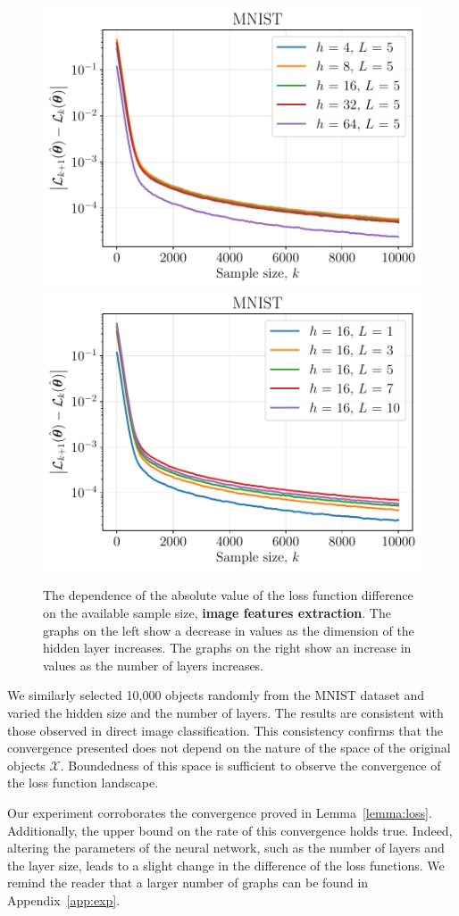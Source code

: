 \documentclass{article}
\begin{document}
\begin{figure}[ht]
    \centering
    \includegraphics[width=0.5\linewidth]{figs_extraction/mnist_hidden_size.pdf}\hfill
    \includegraphics[width=0.5\linewidth]{figs_extraction/mnist_num_layers.pdf}
    \caption{The dependence of the absolute value of the loss function difference on the available sample size, \textbf{image features extraction}. The graphs on the left show a decrease in values as the dimension of the hidden layer increases. The graphs on the right show an increase in values as the number of layers increases.}
    \label{fig:mnist-extraction}
\end{figure}

We similarly selected 10,000 objects randomly from the MNIST dataset and varied the hidden size and the number of layers. The results are consistent with those observed in direct image classification. This consistency confirms that the convergence presented does not depend on the nature of the space of the original objects $\mathcal{X}$. Boundedness of this space is sufficient to observe the convergence of the loss function landscape.

Our experiment corroborates the convergence proved in Lemma~\ref{lemma:loss}. Additionally, the upper bound on the rate of this convergence holds true. Indeed, altering the parameters of the neural network, such as the number of layers and the layer size, leads to a slight change in the difference of the loss functions. We remind the reader that a larger number of graphs can be found in Appendix~\ref{app:exp}.
\end{document}
